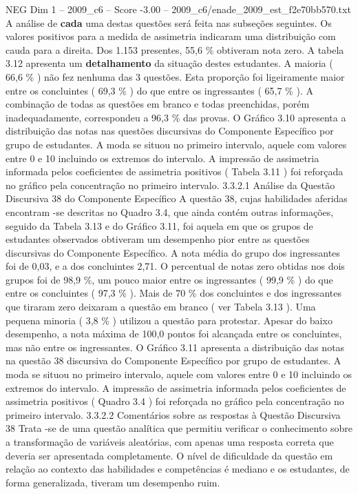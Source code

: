 \begin{textsample}{NEG Dim 1 – 2009\_c6 – Score -3.00 – 2009\_c6/enade\_2009\_est\_f2e70bb570.txt}
A análise de \textbf{cada} uma destas questões será feita nas subseções seguintes.
Os valores positivos para a medida de assimetria indicaram uma distribuição com cauda para a direita.
Dos 1.153 presentes, 55,6 \% obtiveram nota zero.
A tabela 3.12 apresenta um \textbf{detalhamento} da situação destes estudantes.
A maioria ( 66,6 \% ) não fez nenhuma das 3 questões.
Esta proporção foi ligeiramente maior entre os concluintes ( 69,3 \% ) do que entre os ingressantes ( 65,7 \% ).
A combinação de todas as questões em branco e todas preenchidas, porém inadequadamente, correspondeu a 96,3 \% das provas.
O Gráfico 3.10 apresenta a distribuição das notas nas questões discursivas do Componente Específico por grupo de estudantes.
A moda se situou no primeiro intervalo, aquele com valores entre 0 e 10 incluindo os extremos do intervalo.
A impressão de assimetria informada pelos coeficientes de assimetria positivos ( Tabela 3.11 ) foi reforçada no gráfico pela concentração no primeiro intervalo. 3.3.2.1 Análise da Questão Discursiva 38 do Componente Específico A questão 38, cujas habilidades aferidas encontram -se descritas no Quadro 3.4, que ainda contém outras informações, seguido da Tabela 3.13 e do Gráfico 3.11, foi aquela em que os grupos de estudantes observados obtiveram um desempenho pior entre as questões discursivas do Componente Específico.
A nota média do grupo dos ingressantes foi de 0,03, e a dos concluintes 2,71.
O percentual de notas zero obtidas nos dois grupos foi de 98,9 \%, um pouco maior entre os ingressantes ( 99,9 \% ) do que entre os concluintes ( 97,3 \% ).
Mais de 70 \% dos concluintes e dos ingressantes que tiraram zero deixaram a questão em branco ( ver Tabela 3.13 ).
Uma pequena minoria ( 3,8 \% ) utilizou a questão para protestar.
Apesar do baixo desempenho, a nota máxima de 100,0 pontos foi alcançada entre os concluintes, mas não entre os ingressantes.
O Gráfico 3.11 apresenta a distribuição das notas na questão 38 discursiva do Componente Específico por grupo de estudantes.
A moda se situou no primeiro intervalo, aquele com valores entre 0 e 10 incluindo os extremos do intervalo.
A impressão de assimetria informada pelos coeficientes de assimetria positivos ( Quadro 3.4 ) foi reforçada no gráfico pela concentração no primeiro intervalo. 3.3.2.2 Comentários sobre as respostas à Questão Discursiva 38 Trata -se de uma questão analítica que permitiu verificar o conhecimento sobre a transformação de variáveis aleatórias, com apenas uma resposta correta que deveria ser apresentada completamente.
O nível de dificuldade da questão em relação ao contexto das habilidades e competências é mediano e os estudantes, de forma generalizada, tiveram um desempenho ruim.

\end{textsample}

